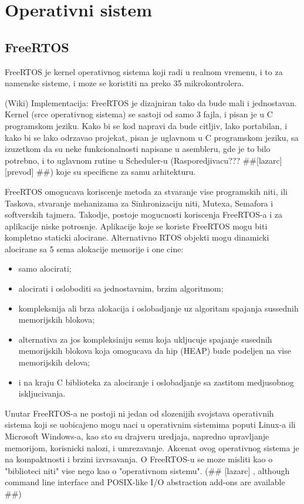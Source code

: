 \documentclass[a4paper,12pt, master]{etf}
\begin{document}
	\newpage

	\chapter{Operativni sistem}

	\section{FreeRTOS}

	FreeRTOS je kernel operativnog sistema koji radi u realnom vremenu, i to za namenske 
	sisteme, i moze se koristiti na preko 35 mikrokontrolera.

	(Wiki) Implementacija:
	FreeRTOS je dizajniran tako da bude mali i jednostavan. Kernel (srce operativnog sistema) 
	se sastoji od samo 3 fajla, i pisan je u C programskom jeziku. Kako bi se kod napravi da 
	bude citljiv, lako portabilan, i kako bi se lako odrzavao projekat, pisan je uglavnom u C
	programskom jeziku, sa izuzetkom da su neke funkcionalnosti napisane u asembleru, gde je to
	bilo potrebno, i to uglavnom rutine u Scheduler-u (Rasporedjivacu??? \#\#[lazarc] [prevod]
	\#\#) koje su specificne za samu arhitekturu.

	FreeRTOS omogucava koriscenje metoda za stvaranje vise programskih niti, ili Taskova, 
	stvaranje mehanizama za Sinhronizaciju niti, Mutexa, Semafora i softverskih tajmera. 
	Takodje, postoje mogucnosti koriscenja FreeRTOS-a i za aplikacije niske potrosnje. 
	Aplikacije koje se koriste FreeRTOS mogu biti kompletno staticki alocirane. Alternativno 
	RTOS objekti mogu dinamicki	alocirane sa 5 sema alokacije memorije i one cine:
	
	\begin{itemize}
		\item samo alocirati;
		\item alocirati i osloboditi sa jednostavnim, brzim algoritmom;
		\item kompleksnija ali brza alokacija i oslobadjanje uz algoritam spajanja sussednih
		memorijskih blokova;
		\item alternativa za jos kompleksiniju semu koja ukljucuje spajanje susednih 
		memorijskih	blokova	koja omogucava da hip (HEAP) bude podeljen na vise memorijskih 
		delova;
		\item i na kraju C biblioteka za alociranje i oslobadjanje sa zastitom medjusobnog 
		iskljucivanja.
	\end{itemize}

	Unutar FreeRTOS-a ne postoji ni jedan od slozenijih svojstava operativnih sistema koji se
	uobicajeno mogu naci u operativnim sistemima poputi Linux-a ili Microsoft Windows-a, kao 
	sto su drajveru uredjaja, napredno upravljanje memorijom, korisnicki nalozi, i 
	umrezavanje. Akcenat ovog operativnog sistema je na kompaktnosti i brzini izvrsavanja. O 
	FreeRTOS-u se moze misliti kao o "biblioteci niti" vise nego kao o "operativnom sistemu". 
	(\#\# [lazarc] , although command line interface and POSIX-like I/O abstraction add-ons 
	are available \#\#)
\end{document}
